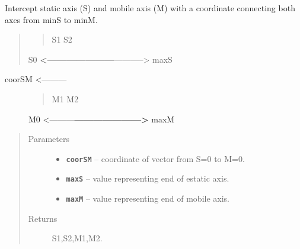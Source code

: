 \documentclass[letterpaper,10pt,english]{sphinxmanual}
\begin{document}
\begin{fulllineitems}
\label{RRtoolbox.lib.arrayops:RRtoolbox.lib.arrayops.basic.axesIntercept}
Intercept static axis (S) and mobile axis (M) with a coordinate connecting
both axes from minS to minM.
\begin{quote}
\begin{quote}

S1                     S2
\end{quote}

S0 {\color{red}\bfseries{}\textbar{}\textless{}---------------------\textbar{}}-----------\textgreater{} maxS
\end{quote}
\begin{description}
\item[{coorSM \textless{}---------\textbar{}                      \textbar{}}] \leavevmode\begin{quote}

M1                     M2
\end{quote}

M0 \textless{}---------{\color{red}\bfseries{}\textbar{}---------------------\textgreater{}\textbar{}} maxM

\end{description}
\begin{quote}\begin{description}
\item[{Parameters}] \leavevmode\begin{itemize}
\item {} 
\textbf{\texttt{coorSM}} -- coordinate of vector from S=0 to M=0.

\item {} 
\textbf{\texttt{maxS}} -- value representing end of estatic axis.

\item {} 
\textbf{\texttt{maxM}} -- value representing end of mobile axis.

\end{itemize}

\item[{Returns}] \leavevmode
S1,S2,M1,M2.

\end{description}\end{quote}

\end{fulllineitems}

\end{document}
